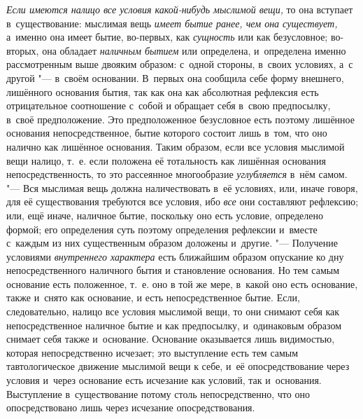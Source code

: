 {\em Если имеются налицо все условия какой-нибудь
мыслимой вещи,} то она вступает в~существование: мыслимая вещь
{\em имеет бытие ранее, чем она существует,} а~именно
она имеет бытие, во-первых, как {\em сущность} или как
безусловное; во-вторых, она обладает {\em наличным
бытием} или определена, и~определена именно рассмотренным выше двояким
образом: с~одной стороны, в~своих условиях, а~с другой "--- в~своём основании.
В~первых она сообщила себе форму внешнего, лишённого основания бытия, так
как она как абсолютная рефлексия есть отрицательное соотношение с~собой и
обращает себя в~свою предпосылку, в~своё предположение. Это предположенное
безусловное есть поэтому лишённое основания непосредственное, бытие
которого состоит лишь в~том, что оно налично как лишённое основания. Таким
образом, если все условия мыслимой вещи налицо, т.~е. если положена её
тотальность как лишённая основания непосредственность, то это рассеянное
многообразие {\em углубляется} в~нём самом. "--- Вся
мыслимая вещь должна наличествовать в~её условиях, или, иначе говоря, для
её существования требуются все условия, ибо {\em все}
они составляют рефлексию; или, ещё иначе, наличное бытие, поскольку оно
есть условие, определено формой; его определения суть поэтому определения
рефлексии и~вместе с~каждым из них существенным образом доложены и~другие.
"--- Получение условиями {\em внутреннего характера} есть
ближайшим образом опускание ко дну непосредственного наличного бытия и
становление основания. Но тем самым основание есть положенное, т.~е. оно в
той же мере, в~какой оно есть основание, также и~снято как основание, и
есть непосредственное бытие. Если, следовательно, налицо все условия
мыслимой вещи, то они снимают себя как непосредственное наличное бытие и
как предпосылку, и~одинаковым образом снимает себя также и~основание.
Основание оказывается лишь видимостью, которая непосредственно исчезает;
это выступление есть тем самым тавтологическое движение мыслимой вещи к
себе, и~её опосредствование через условия и~через основание есть исчезание
как условий, так и~основания. Выступление в~существование потому столь
непосредственно, что оно опосредствовано лишь через исчезание
опосредствования.

